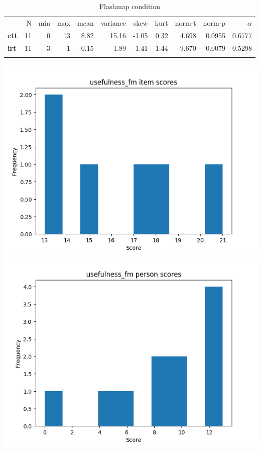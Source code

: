 \begin{longtable}[c]{@{}lrrrrrrrrrr@{}}
\caption{Flashmap condition}
\endfirsthead
\toprule\addlinespace
& N & min & max & mean & variance & skew & kurt & norm-t &
norm-p & $\alpha$
\\\addlinespace
\midrule
\textbf{ctt} & 11 & 0 & 13 & 8.82 & 15.16 & -1.05 & 0.32 & 4.698 &
0.0955 & 0.6777
\\\addlinespace
\textbf{irt} & 11 & -3 & 1 & -0.15 & 1.89 & -1.41 & 1.44 & 9.670 &
0.0079 & 0.5298
\\\addlinespace
\bottomrule
\end{longtable}

\includegraphics[width=\textwidth]{img/usefulness_fm_diff.png}
\includegraphics[width=\textwidth]{img/usefulness_fm_abil.png}

